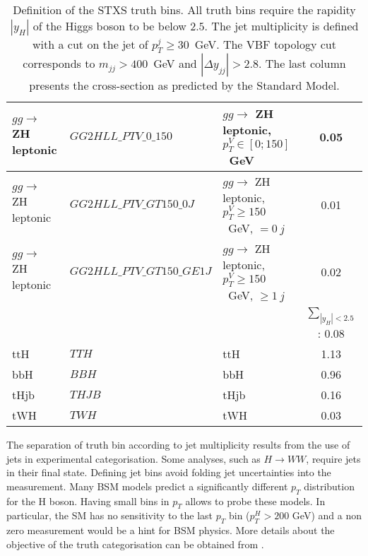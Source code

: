 \begin{enumerate}
\begin{table}[h!]
{\begin{tabular}{|l|l|l|c|}
\hline
\hline
$gg\rightarrow$ ZH leptonic  &$GG2HLL\_PTV\_0\_150$         &$gg\rightarrow$ ZH leptonic, $p_T^V\in [0 ; 150]$~GeV &0.05\\
\hline
$gg\rightarrow$ ZH leptonic  &$GG2HLL\_PTV\_GT150\_0J$      &$gg\rightarrow$ ZH leptonic, $p_T^V\ge 150$~GeV, $=0\ j$ &0.01\\
\hline
$gg\rightarrow$ ZH leptonic  &$GG2HLL\_PTV\_GT150\_GE1J$    &$gg\rightarrow$ ZH leptonic, $p_T^V\ge 150$~GeV, $\ge 1\ j$ &0.02\\
\hline
\multicolumn{3}{|c|}{}                                         &$\sum_{|y_H|<2.5}$ : 0.08\\
\hline
\hline
ttH               &$TTH$                   &ttH &1.13\\
\hline
bbH               &$BBH$                   &bbH &0.96\\
\hline
tHjb              &$THJB$                  &tHjb &0.16\\
\hline
tWH               &$TWH$                   &tWH &0.03\\
\hline
\end{tabular}}
\caption{Definition of the STXS truth bins. All truth bins require the rapidity $|y_H|$ of the Higgs boson to be below $2.5$. The jet multiplicity is defined with a cut on the jet of $p_T^j\ge 30$~GeV. The VBF topology cut corresponds to $m_{jj}>400$~GeV and $|\Delta y_{jj}|>2.8$. The last column presents the cross-section as predicted by the Standard Model. \cite{ATL-COM-PHYS-2016-1784}}
\label{tab:HGam_stxs_definition}
\end{table}


The separation of truth bin according to jet multiplicity results from the use of jets in experimental categorisation.
Some analyses, such as \(H\rightarrow WW\), require jets in their final state.
Defining jet bins avoid folding jet uncertainties into the measurement.
Many BSM models predict a significantly different $p_T$ distribution for the H boson.
Having small bins in $p_T$ allows to probe these models.
In particular, the SM has no sensitivity to the last $p_T$ bin ($p_T^H>200$ GeV) and a non zero measurement would be a hint for BSM physics.
More details about the objective of the truth categorisation can be obtained from \cite{arXiv_1605.04692,ATL-COM-PHYS-2016-1784}.



\end{enumerate}
